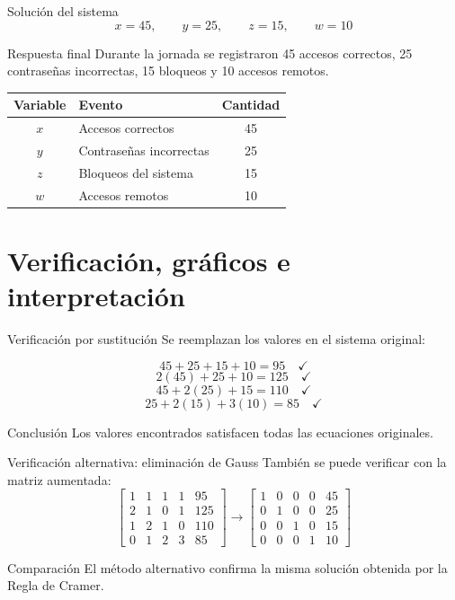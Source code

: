 \documentclass[aspectratio=169]{beamer}
\begin{document}
\begin{frame}{Solución del sistema}
\[
x=45,\qquad y=25,\qquad z=15,\qquad w=10
\]

\begin{alertblock}{Respuesta final}
Durante la jornada se registraron 45 accesos correctos, 25 contraseñas incorrectas, 15 bloqueos y 10 accesos remotos.
\end{alertblock}

\begin{table}
\centering
\begin{tabular}{clc}
\toprule
Variable & Evento & Cantidad \\
\midrule
$x$ & Accesos correctos & 45 \\
$y$ & Contraseñas incorrectas & 25 \\
$z$ & Bloqueos del sistema & 15 \\
$w$ & Accesos remotos & 10 \\
\bottomrule
\end{tabular}
\end{table}
\end{frame}

\section{Verificación, gráficos e interpretación}

\begin{frame}[shrink=5]{Verificación por sustitución}
Se reemplazan los valores en el sistema original:

\[
45+25+15+10=95\quad \checkmark
\]
\[
2(45)+25+10=125\quad \checkmark
\]
\[
45+2(25)+15=110\quad \checkmark
\]
\[
25+2(15)+3(10)=85\quad \checkmark
\]

\begin{block}{Conclusión}
Los valores encontrados satisfacen todas las ecuaciones originales.
\end{block}
\end{frame}

\begin{frame}[shrink=8]{Verificación alternativa: eliminación de Gauss}
También se puede verificar con la matriz aumentada:
\[
\left[\begin{array}{cccc|c}
1&1&1&1&95\\
2&1&0&1&125\\
1&2&1&0&110\\
0&1&2&3&85
\end{array}\right]
\longrightarrow
\left[\begin{array}{cccc|c}
1&0&0&0&45\\
0&1&0&0&25\\
0&0&1&0&15\\
0&0&0&1&10
\end{array}\right]
\]

\begin{block}{Comparación}
El método alternativo confirma la misma solución obtenida por la Regla de Cramer.
\end{block}
\end{frame}
\end{document}
